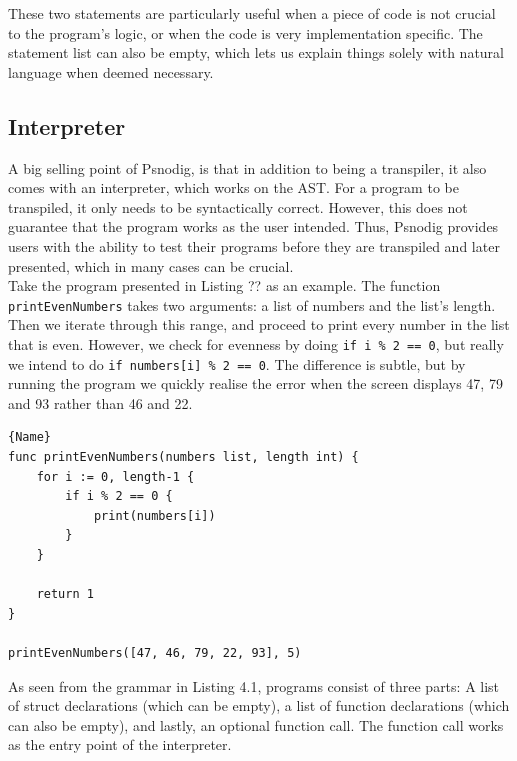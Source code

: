 These two statements are particularly useful when a piece of code is not crucial to the program's logic, or when the code is very implementation specific. The statement list can also be empty, which lets us explain things solely with natural language when deemed necessary. \hfill \\

\subsection{Interpreter}

A big selling point of Psnodig, is that in addition to being a transpiler, it also comes with an interpreter, which works on the AST. For a program to be transpiled, it only needs to be syntactically correct. However, this does not guarantee that the program works as the user intended. Thus, Psnodig provides users with the ability to test their programs before they are transpiled and later presented, which in many cases can be crucial. \hfill \\

Take the program presented in Listing ?? as an example. The function \\ \texttt{printEvenNumbers} takes two arguments: a list of numbers and the list's length. Then we iterate through this range, and proceed to print every number in the list that is even. However, we check for evenness by doing \texttt{if i \% 2 == 0}, but really we intend to do \texttt{if numbers[i] \% 2 == 0}. The difference is subtle, but by running the program we quickly realise the error when the screen displays 47, 79 and 93 rather than 46 and 22. \hfill \\

\begin{lstlisting}[caption={A syntactically correct program with a subtle logical error}, captionpos=b, frame=tlrb]{Name}
func printEvenNumbers(numbers list, length int) {
    for i := 0, length-1 {
        if i % 2 == 0 {
            print(numbers[i])
        }
    }

    return 1
}

printEvenNumbers([47, 46, 79, 22, 93], 5)
\end{lstlisting}

As seen from the grammar in Listing 4.1, programs consist of three parts: A list of struct declarations (which can be empty), a list of function declarations (which can also be empty), and lastly, an optional function call. The function call works as the entry point of the interpreter.

